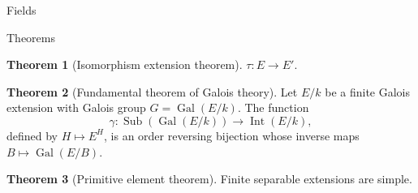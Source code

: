 \documentclass{article}
\theoremstyle{definition}
\newtheorem{theorem}{Theorem}
\numberwithin{theorem}{subsection} %
\theoremstyle{remark}
\theoremstyle{definition}
\newcommand{\Gal}{\operatorname{Gal}}
\newcommand{\fn}[3]{{#1 \colon #2 \rightarrow #3}}
\begin{document}
\begin{section}{Fields}
\begin{subsection}{Theorems}
\begin{theorem}[Isomorphism extension theorem]
      $\fn \tau E E'$.
    \end{theorem}
    \begin{theorem}[Fundamental theorem of Galois theory] %
      Let $E/k$ be a finite Galois extension with Galois group $G = \Gal(E/k)$.
      The function \[
        \fn \gamma {\operatorname{Sub}(\Gal(E/k))} {\operatorname{Int}(E/k)},
      \]
      defined by $H \mapsto E^H$, is an order reversing bijection whose
      inverse maps ${B \mapsto \Gal(E/B)}$.
    \end{theorem}
    \begin{theorem}[Primitive element theorem]
      Finite separable extensions are simple.
    \end{theorem}
  \end{subsection}
\end{section}
\pagebreak
\end{document}

